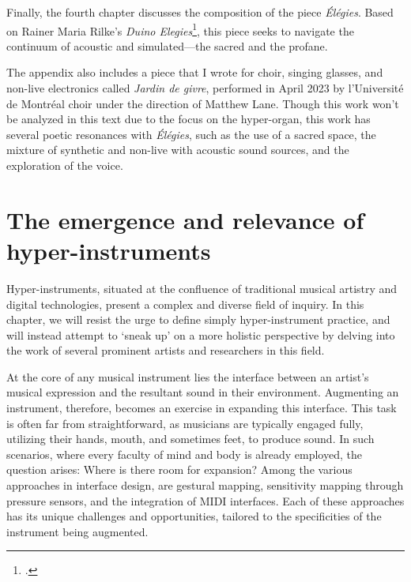 \documentclass[12pt,twoside,maitrise]{dms_ks}
\theoremstyle{definition}
\begin{document}
Finally, the fourth chapter discusses the composition of the piece \textit{Élégies}. 
Based on Rainer Maria Rilke's \textit{Duino Elegies}\footcite{rilke_egies_1986}, this piece seeks to navigate the continuum of acoustic and simulated---the sacred and the profane.

The appendix also includes a piece that I wrote for choir, singing glasses, and non-live electronics called \textit{Jardin de givre}, performed in April 2023 by l'Université de Montréal choir under the direction of Matthew Lane. Though this work won't be analyzed in this text due to the focus on the hyper-organ, this work has several poetic resonances with \textit{Élégies}, such as the use of a sacred space, the mixture of synthetic and non-live with acoustic sound sources, and the exploration of the voice.



\chapter{The emergence and relevance of hyper-instruments}

Hyper-instruments, situated at the confluence of traditional musical artistry and digital technologies, present a complex and diverse field of inquiry.
In this chapter, we will resist the urge to define simply hyper-instrument practice, and will instead attempt to `sneak up' on a more holistic perspective by delving into the work of several prominent artists and researchers in this field.

At the core of any musical instrument lies the interface between an artist's musical expression and the resultant sound in their environment.
Augmenting an instrument, therefore, becomes an exercise in expanding this interface.
This task is often far from straightforward, as musicians are typically engaged fully, utilizing their hands, mouth, and sometimes feet, to produce sound.
In such scenarios, where every faculty of mind and body is already employed, the question arises: Where is there room for expansion?
Among the various approaches in interface design, are gestural mapping, sensitivity mapping through pressure sensors, and the integration of MIDI interfaces.
Each of these approaches has its unique challenges and opportunities, tailored to the specificities of the instrument being augmented.
\end{document}
